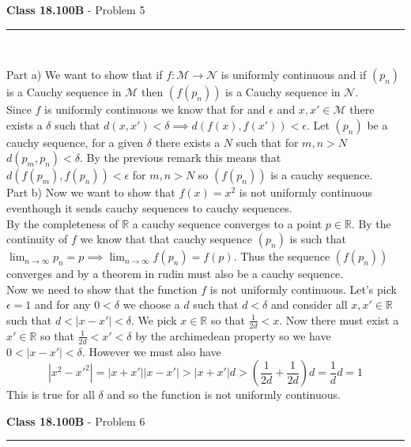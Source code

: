 \documentclass[11pt,reqno]{article}
\begin{document}
\vspace{15pt}
\begin{flushleft} 
\textbf{Class 18.100B} - Problem 5\\
\rule{500pt}{1pt}\\
\end{flushleft} 

\noindent Part a) We want to show that if $f: \mathcal{M} \to \mathcal{N}$ is uniformly continuous and if $(p_n)$ is a Cauchy sequence in $\mathcal{M}$ then $(f(p_n))$ is a Cauchy sequence in $\mathcal{N}$.\\
\indent Since $f$ is uniformly continuous we know that for and $\epsilon$ and $x, x' \in \mathcal{M}$ there exists a $\delta$ such that $d(x,x') < \delta \implies d(f(x),f(x')) < \epsilon$. Let $(p_n)$ be a cauchy sequence, for a given $\delta$ there exists a $N$ such that for $m,n > N$ $d(p_m,p_n) < \delta$. By the previous remark this means that $d(f(p_m),f(p_n)) < \epsilon$ for $m,n > N$ so $(f(p_n))$ is a cauchy sequence. \\

\noindent Part b) Now we want to show that $f(x) = x^2$ is not uniformly continuous eventhough it sends cauchy sequences to cauchy sequences.\\
\indent By the completeness of $\mathbb{R}$ a cauchy sequence converges to a point $p \in \mathbb{R}$. By the continuity of $f$ we know that that cauchy sequence $(p_n)$ is such that $\lim_{n \to \infty} p_n = p \implies \lim_{n \to \infty} f(p_n) = f(p)$. Thus the sequence $(f(p_n))$ converges and by a theorem in rudin must also be a cauchy sequence.\\
\indent Now we need to show that the function $f$ is not uniformly continuous. Let's pick $\epsilon = 1$ and for any $0 < \delta$ we choose a $d$ such that $d < \delta$ and consider all $x,x' \in \mathbb{R}$ such that $d < |x-x'| < \delta$. We pick $x \in \mathbb{R}$ so that $\frac{1}{2d} < x$. Now there must exist a $x' \in \mathbb{R}$ so that $\frac{1}{2d} < x' < \delta$ by the archimedean property so we have $0 < |x - x'| < \delta$. However we must also have \[|x^2 - x'^2| = |x+x'||x-x'| > |x+x'|d > (\frac{1}{2d}+\frac{1}{2d})d = \frac{1}{d}d = 1\]
This is true for all $\delta$ and so the function is not uniformly continuous.

\vspace{15pt}
\begin{flushleft} 
\textbf{Class 18.100B} - Problem 6\\
\rule{500pt}{1pt}\\
\end{flushleft} 
\end{document}
